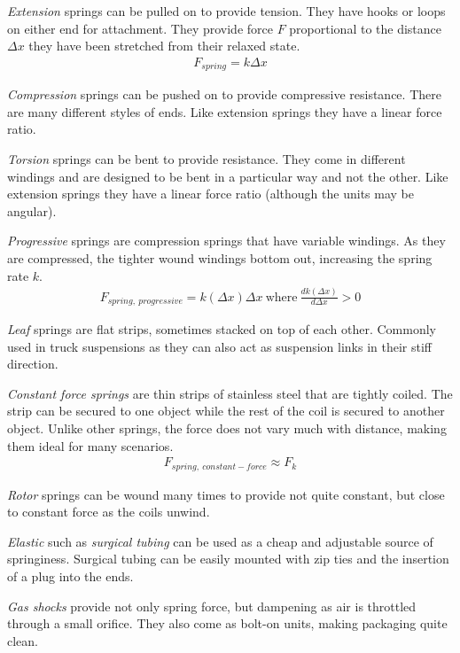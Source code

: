 	\begin{asparaenum}[a)]
		\item \textit{Extension}  springs can be pulled on to provide tension. They have hooks or loops on either end for attachment. They provide force $F$ proportional to the distance $\Delta x$ they have been stretched from their relaxed state.
		\begin{align}
			F_{spring} = k \Delta x
		\end{align}
		\item \textit{Compression}  springs can be pushed on to provide compressive resistance. There are many different styles of ends. Like extension springs they have a linear force ratio.
		\item \textit{Torsion}  springs can be bent to provide resistance. They come in different windings and are designed to be bent in a particular way and not the other. Like extension springs they have a linear force ratio (although the units may be angular).
		\item \textit{Progressive}  springs are compression springs that have variable windings. As they are compressed, the tighter wound windings bottom out, increasing the spring rate $k$.
		\begin{align}
			F_{spring,\ progressive} = k(\Delta x) \Delta x \ \mbox{where} \ \frac{d k(\Delta x)}{d \Delta x} > 0
		\end{align}
		\item \textit{Leaf}  springs are flat strips, sometimes stacked on top of each other. Commonly used in truck suspensions as they can also act as suspension links in their stiff direction.
		\item \textit{Constant force springs}  are thin strips of stainless steel that are tightly coiled. The strip can be secured to one object while the rest of the coil is secured to another object. Unlike other springs, the force does not vary much with distance, making them ideal for many scenarios.
		\begin{align}
			F_{spring, \ constant-force} \approx F_k
		\end{align}
		\item \textit{Rotor}  springs can be wound many times to provide not quite constant, but close to constant force as the coils unwind.		
		\item \textit{Elastic}  such as \textit{surgical tubing} can be used as a cheap and adjustable source of springiness. Surgical tubing can be easily mounted with zip ties and the insertion of a plug into the ends.
		\item \textit{Gas shocks} provide not only spring force, but dampening as air is throttled through a small orifice. They also come as bolt-on units, making packaging quite clean.
	\end{asparaenum}
	
